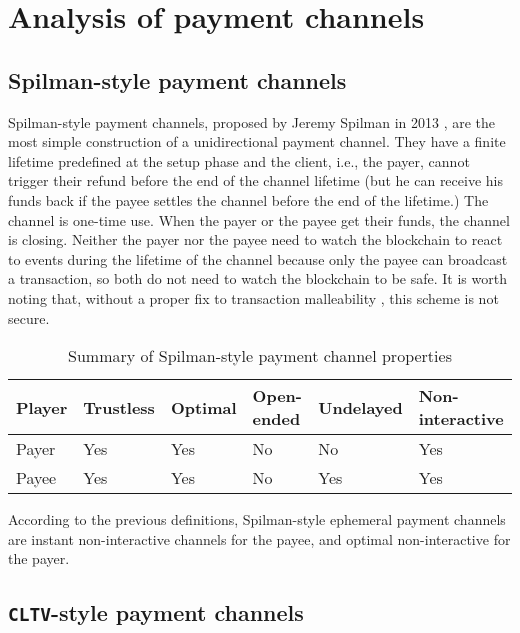 \section{Analysis of payment channels}

\subsection{Spilman-style payment channels}

Spilman-style payment channels, proposed by Jeremy Spilman in 2013
\cite{SpilmanStyle}, are the most simple construction of a unidirectional
payment channel. They have a finite lifetime predefined at the setup phase and
the client, i.e., the payer, cannot trigger their refund before the end of the
channel lifetime (but he can receive his funds back if the payee settles the
channel before the end of the lifetime.) The channel is one-time use. When the
payer or the payee get their funds, the channel is closing. Neither the payer nor the
payee need to watch the blockchain to react to events during the lifetime of
the channel because only the payee can broadcast a transaction, so both do not
need to watch the blockchain to be safe. It is worth noting that, without a
proper fix to transaction malleability \cite{SegWitBIP, BIP62,
DBLP:journals/corr/AndrychowiczDMM13, DBLP:journals/corr/DeckerW14}, this scheme
is not secure.

\begin{table}[h]
  \begin{tabularx}{\textwidth}{ | X | l | l | l | l | l |}
  \hline
  Player & Trustless & Optimal & Open-ended & Undelayed & Non-interactive \\ \hline \hline
  Payer & Yes & Yes & No & No & Yes \\ \hline
  Payee & Yes & Yes & No & Yes & Yes \\
  \hline
  \end{tabularx}
  \caption{Summary of Spilman-style payment channel properties}
  \label{fig:summarySpilmanPaymentChannel}
\end{table}

According to the previous definitions, Spilman-style ephemeral payment channels are
instant non-interactive channels for the payee, and optimal non-interactive for
the payer.

\subsection{\texttt{CLTV}-style payment channels}

